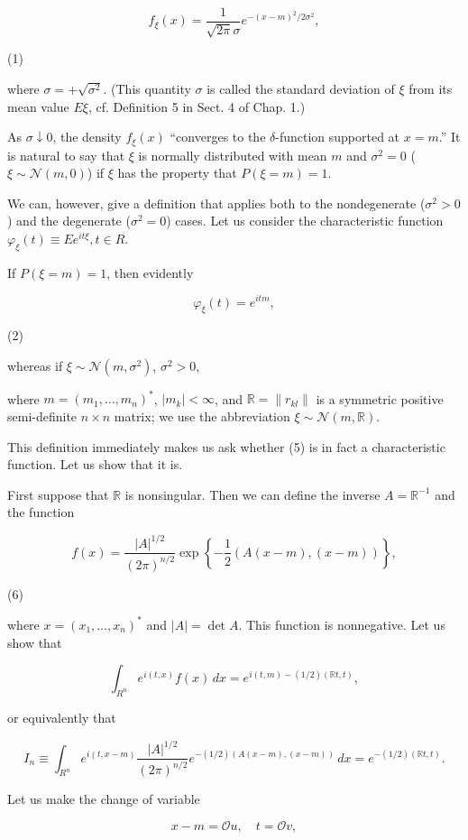 $$f_\xi(x) = \frac{1}{\sqrt{2\pi}\sigma} e^{-(x-m)^2/2\sigma^2},$$

(1)

where $\sigma = +\sqrt{\sigma^2}$. (This quantity $\sigma$ is called the standard deviation of $\xi$ from its mean value $E\xi$, cf. Definition 5 in Sect. 4 of Chap. 1.)

As $\sigma \downarrow 0$, the density $f_\xi(x)$ “converges to the $\delta$-function supported at $x = m$.” It is natural to say that $\xi$ is normally distributed with mean $m$ and $\sigma^2 = 0$ ($\xi \sim \mathcal{N}(m, 0)$) if $\xi$ has the property that $P(\xi = m) = 1$.

We can, however, give a definition that applies both to the nondegenerate ($\sigma^2 > 0$) and the degenerate ($\sigma^2 = 0$) cases. Let us consider the characteristic function $\varphi_\xi(t) \equiv E e^{it\xi}, t \in R$.

If $P(\xi = m) = 1$, then evidently

$$\varphi_\xi(t) = e^{itm},$$

(2)

whereas if $\xi \sim \mathcal{N}(m, \sigma^2)$, $\sigma^2 > 0$,

where $m = (m_1, \ldots, m_n)^*$, $|m_k| < \infty$, and $\mathbb{R} = \|r_{kl}\|$ is a symmetric positive semi-definite $n \times n$ matrix; we use the abbreviation $\xi \sim \mathcal{N}(m, \mathbb{R})$.

This definition immediately makes us ask whether (5) is in fact a characteristic function. Let us show that it is.

First suppose that $\mathbb{R}$ is nonsingular. Then we can define the inverse $A = \mathbb{R}^{-1}$ and the function

$$f(x) = \frac{|A|^{1/2}}{(2\pi)^{n/2}} \exp\left\{-\frac{1}{2}(A(x-m), (x-m))\right\},$$

(6)

where $x = (x_1, \ldots, x_n)^*$ and $|A| = \det A$. This function is nonnegative. Let us show that

$$\int_{R^n} e^{i(t,x)}f(x) \, dx = e^{i(t,m)-(1/2)(\mathbb{R}t,t)},$$

or equivalently that

$$I_n \equiv \int_{R^n} e^{i(t,x-m)} \frac{|A|^{1/2}}{(2\pi)^{n/2}} e^{-(1/2)(A(x-m), (x-m))} \, dx = e^{-(1/2)(\mathbb{R}t,t)}.$$

Let us make the change of variable

$$x - m = \mathcal{O}u, \quad t = \mathcal{O}v,$$

